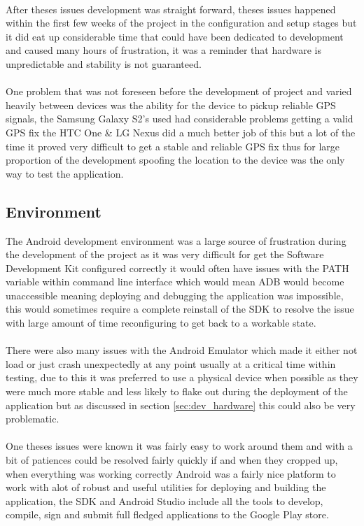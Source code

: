 \\
After theses issues development was straight forward, theses issues happened within the first few weeks of the project in the configuration and setup stages but it did eat up considerable time that could have been dedicated to development and caused many hours of frustration, it was a reminder that hardware is unpredictable and stability is not guaranteed.\\
\\
One problem that was not foreseen before the development of project and varied heavily between devices was the ability for the device to pickup reliable GPS signals, the Samsung Galaxy S2's used had considerable problems getting a valid GPS fix the HTC One \& LG Nexus did a much better job of this but a lot of the time it proved very difficult to get a stable and reliable GPS fix thus for large proportion of the development spoofing the location to the device was the only way to test the application.

\subsection{Environment}

The Android development environment was a large source of frustration during the development of the project as it was very difficult for get the Software Development Kit configured correctly it would often have issues with the PATH variable within command line interface which would mean ADB would become unaccessible meaning deploying and debugging the application was impossible, this would sometimes require a complete reinstall of the SDK to resolve the issue with large amount of time reconfiguring to get back to a workable state.\\
\\
There were also many issues with the Android Emulator which made it either not load or just crash unexpectedly at any point usually at a critical time within testing, due to this it was preferred to use a physical device when possible as they were much more stable and less likely to flake out during the deployment of the application but as discussed in section \ref{sec:dev_hardware} this could also be very problematic.\\
\\
One theses issues were known it was fairly easy to work around them and with a bit of patiences could be resolved fairly quickly if and when they cropped up, when everything was working correctly Android was a fairly nice platform to work with alot of robust and useful utilities for deploying and building the application, the SDK and Android Studio include all the tools to develop, compile, sign and submit full fledged applications to the Google Play store.

